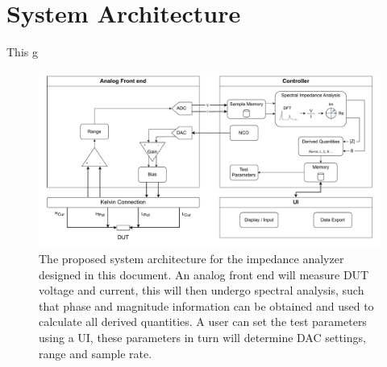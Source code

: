 \chapter{System Architecture} \label{ch:SysArchitecture}
This g
\begin{figure}[H]
    \centering
    \includegraphics[width=1\textwidth]{Sections/6_SystemArchitecture/Figures/SystemArchitecture.pdf}
    \caption{The proposed system architecture for the impedance analyzer designed in this document. An analog front end will measure DUT voltage and current, 
    this will then undergo spectral analysis, such that phase and magnitude information can be obtained and used to calculate all derived quantities. A user can set the test parameters using a UI, these parameters in turn will determine DAC settings, range and sample rate.}
    \label{fig_6_SysArchitecture}
\end{figure}